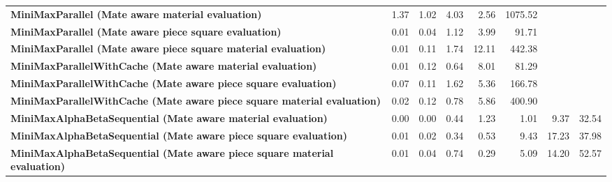 \begin{table}[H]
{\begin{tabular}{|p{8cm}|*{7}{r|}}
            \rowcolor[HTML]{FFFFFF}
            \textbf{MiniMaxParallel (Mate aware material evaluation)}                                  & 1.37                                  & 1.02                                  & 4.03                                  & 2.56                                  & 1075.52 &  &  \\
            \rowcolor[HTML]{EFEFEF}
            \textbf{MiniMaxParallel (Mate aware piece square evaluation)}                              & 0.01                                  & 0.04                                  & 1.12                                  & 3.99 & 91.71 &  &  \\
            \rowcolor[HTML]{FFFFFF}
            \textbf{MiniMaxParallel (Mate aware piece square material evaluation)}                     & 0.01                                  & 0.11 & 1.74 & 12.11 & 442.38 &  &  \\

            \rowcolor[HTML]{EFEFEF}
            \textbf{MiniMaxParallelWithCache (Mate aware material evaluation)}                         & 0.01                                  & 0.12                                  & 0.64 & 8.01 & 81.29 &  &  \\
            \rowcolor[HTML]{FFFFFF}
            \textbf{MiniMaxParallelWithCache (Mate aware piece square evaluation)}                     & 0.07                                  & 0.11 & 1.62 & 5.36 & 166.78 &  &  \\
            \rowcolor[HTML]{EFEFEF}
            \textbf{MiniMaxParallelWithCache (Mate aware piece square material evaluation)}            & 0.02 & 0.12 & 0.78 & 5.86 & 400.90 &  &  \\

            \rowcolor[HTML]{FFFFFF}
            \textbf{MiniMaxAlphaBetaSequential (Mate aware material evaluation)}                       & 0.00                                  & 0.00                                  & 0.44 & 1.23 & 1.01 & 9.37 & 32.54 \\
            \rowcolor[HTML]{EFEFEF}
            \textbf{MiniMaxAlphaBetaSequential (Mate aware piece square evaluation)}                   & 0.01                                  & 0.02 & 0.34 & 0.53 & 9.43 & 17.23 & 37.98 \\
            \rowcolor[HTML]{FFFFFF}
            \textbf{MiniMaxAlphaBetaSequential (Mate aware piece square material evaluation)}               & 0.01 & 0.04 & 0.74 & 0.29 & 5.09 & 14.20 & 52.57 \\


\end{tabular}}
\end{table}

